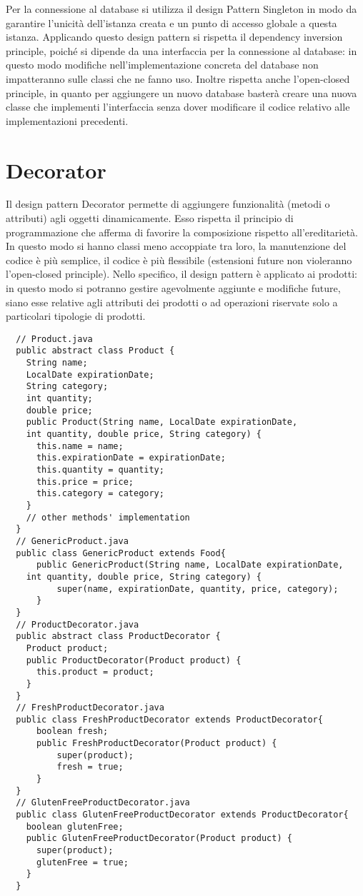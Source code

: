Per la connessione al database si utilizza il design Pattern Singleton in modo da garantire l'unicità dell'istanza creata e un punto di accesso globale a questa istanza. Applicando questo design pattern si rispetta il dependency inversion principle, poiché si dipende da una interfaccia per la connessione al database: in questo modo modifiche nell'implementazione concreta del database non impatteranno sulle classi che ne fanno uso. Inoltre rispetta anche l'open-closed principle, in quanto per aggiungere un nuovo database basterà creare una nuova classe che implementi l'interfaccia senza dover modificare il codice relativo alle implementazioni precedenti.

\section{Decorator}

Il design pattern Decorator permette di aggiungere funzionalità (metodi o attributi) agli oggetti dinamicamente. Esso rispetta il principio di programmazione che afferma di favorire la composizione rispetto all'ereditarietà. In questo modo si hanno classi meno accoppiate tra loro, la manutenzione del codice è più semplice, il codice è più flessibile (estensioni future non violeranno l'open-closed principle). Nello specifico, il design pattern è applicato ai prodotti: in questo modo si potranno gestire agevolmente aggiunte e modifiche future, siano esse relative agli attributi dei prodotti o ad operazioni riservate solo a particolari tipologie di prodotti.

\begin{lstlisting}
  // Product.java
  public abstract class Product {
    String name;
    LocalDate expirationDate;
    String category;
    int quantity;
    double price;
    public Product(String name, LocalDate expirationDate,
    int quantity, double price, String category) {
      this.name = name;
      this.expirationDate = expirationDate;
      this.quantity = quantity;
      this.price = price;
      this.category = category;
    }
    // other methods' implementation
  }
  // GenericProduct.java
  public class GenericProduct extends Food{
	  public GenericProduct(String name, LocalDate expirationDate,
    int quantity, double price, String category) {
		  super(name, expirationDate, quantity, price, category);
	  }
  }
  // ProductDecorator.java
  public abstract class ProductDecorator {
    Product product;
    public ProductDecorator(Product product) {
      this.product = product;
    }
  }
  // FreshProductDecorator.java
  public class FreshProductDecorator extends ProductDecorator{
	  boolean fresh;
	  public FreshProductDecorator(Product product) {
		  super(product);
		  fresh = true;
	  }
  }
  // GlutenFreeProductDecorator.java
  public class GlutenFreeProductDecorator extends ProductDecorator{
    boolean glutenFree;
    public GlutenFreeProductDecorator(Product product) {
      super(product);
      glutenFree = true;
    }
  }
\end{lstlisting}